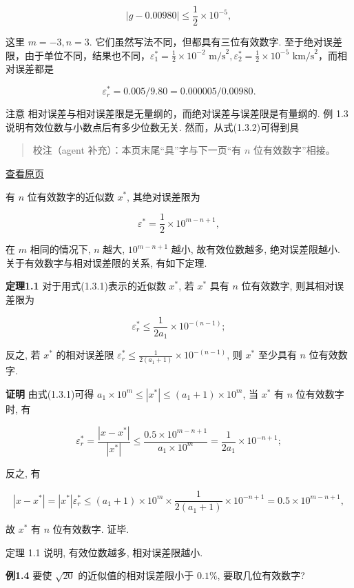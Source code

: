 \documentclass[
  10pt,
  fontset=fandol]{ctexart}
\begin{document}
\[
|g - 0.00980| \leqslant \frac{1}{2} \times 10^{-5},
\]

这里 \(m=-3, n=3\). 它们虽然写法不同，但都具有三位有效数字. 至于绝对误差限，由于单位不同，结果也不同，\(\varepsilon_1^* = \frac{1}{2} \times 10^{-2} \text{ m/s}^2,\allowbreak  \varepsilon_2^* = \frac{1}{2} \times 10^{-5} \text{ km/s}^2\)，而相对误差都是

\[
\varepsilon_r^* = 0.005/9.80 = 0.000005/0.00980.
\]

注意 相对误差与相对误差限是无量纲的，而绝对误差与误差限是有量纲的. 例 1.3 说明有效位数与小数点后有多少位数无关. 然而，从式(1.3.2)可得到具

\begin{quote}
校注（agent 补充）：本页末尾``具''字与下一页``有 \(n\) 位有效数字''相接。
\end{quote}

\href{../../source-images/pdf-020.jpeg}{查看原页}

有 \(n\) 位有效数字的近似数 \(x^*\), 其绝对误差限为

\[
\varepsilon^* = \frac{1}{2} \times 10^{m-n+1},
\]

在 \(m\) 相同的情况下, \(n\) 越大, \(10^{m-n+1}\) 越小, 故有效位数越多, 绝对误差限越小. 关于有效数字与相对误差限的关系, 有如下定理.

\textbf{定理1.1} 对于用式(1.3.1)表示的近似数 \(x^*\), 若 \(x^*\) 具有 \(n\) 位有效数字, 则其相对误差限为

\[
\varepsilon_r^* \leqslant \frac{1}{2a_1} \times 10^{-(n-1)};
\]

反之, 若 \(x^*\) 的相对误差限 \(\varepsilon_r^* \leqslant \frac{1}{2(a_1+1)} \times 10^{-(n-1)}\), 则 \(x^*\) 至少具有 \(n\) 位有效数字.

\textbf{证明} 由式(1.3.1)可得 \(a_1 \times 10^m \leqslant |x^*| \leqslant (a_1+1) \times 10^m\), 当 \(x^*\) 有 \(n\) 位有效数字时, 有

\[
\varepsilon_r^* = \frac{|x-x^*|}{|x^*|} \leqslant \frac{0.5 \times 10^{m-n+1}}{a_1 \times 10^m} = \frac{1}{2a_1} \times 10^{-n+1};
\]

反之, 有

\[
|x-x^*| = |x^*| \varepsilon_r^* \leqslant (a_1+1) \times 10^m \times \frac{1}{2(a_1+1)} \times 10^{-n+1} = 0.5 \times 10^{m-n+1},
\]

故 \(x^*\) 有 \(n\) 位有效数字. 证毕.

定理 1.1 说明, 有效位数越多, 相对误差限越小.

\textbf{例1.4} 要使 \(\sqrt{20}\) 的近似值的相对误差限小于 \(0.1\%\), 要取几位有效数字?
\end{document}
